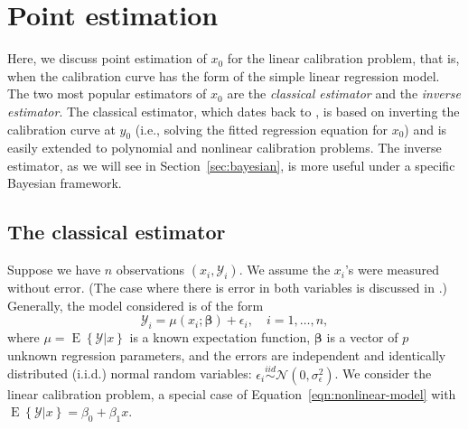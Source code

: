 \documentclass[cmfont,usenames,dvipsnames,leqno]{afit-etd}\usepackage[]{graphicx}\usepackage[]{color}
\newcommand{\mc}[1]{\ensuremath{\mathcal{#1}}}
\newcommand{\E}{\operatorname{E}}
\begin{document}
\section{Point estimation}
\label{sec:point-estimation}

Here, we discuss point estimation of $x_0$ for the linear calibration problem, that is, when the calibration curve has the form of the simple linear regression model. The two most popular estimators of $x_0$ are the \textit{classical estimator} and the \textit{inverse estimator}. The classical estimator, which dates back to \citet{eisenhart_interpretation_1939}, is based on inverting the calibration curve at $y_0$ (i.e., solving the fitted regression equation for $x_0$) and is easily extended to polynomial and nonlinear calibration problems. The inverse estimator, as we will see in Section~\ref{sec:bayesian}, is more useful under a specific Bayesian framework.  

\subsection{The classical estimator}
Suppose we have $n$ observations $(x_i, \mc{Y}_i)$. We assume the $x_i$'s were measured without error. (The case where there is error in both variables is discussed in \citet{carroll_effect_1986}.) Generally, the model considered is of the form
\begin{equation}
\label{eqn:nonlinear-model}
  \mc{Y}_i = \mu\left(x_i; \bm{\beta}\right) + \epsilon_i, \quad i = 1, \dotsc, n,
\end{equation}  
where $\mu = \E\left\{\mc{Y} | x\right\}$ is a known expectation function, $\bm{\beta}$ is a vector of $p$ unknown regression parameters, and the errors are independent and identically distributed (i.i.d.) normal random variables: $\epsilon_i \stackrel{iid}{\sim} \mc{N}(0, \sigma_\epsilon^2)$. We consider the linear calibration problem, a special case of Equation~\eqref{eqn:nonlinear-model} with $\E\left\{\mc{Y} | x\right\} = \beta_0 + \beta_1 x$. 
\end{document}
